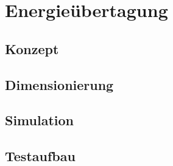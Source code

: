 \section{Energieübertagung}

\subsection{Konzept}

\subsection{Dimensionierung}

\subsection{Simulation}

\subsection{Testaufbau}